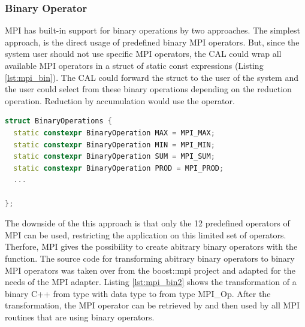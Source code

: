 
\subsubsection{Binary Operator}
\label{sec:bin_operator}

MPI has built-in support for binary operations by two approaches. The
simplest approach, is the direct usage of predefined binary MPI
operators\cite{ref:mpi_bin_op}. But, since the system user should not
use specific MPI operators, the CAL could wrap all available MPI
operators in a struct of static const expressions (Listing
\ref{lst:mpi_bin}).  The CAL could forward the struct to the user of
the system and the user could select from these binary operations
depending on the reduction operation. Reduction by accumulation would
use the  operator.


\begin{lstlisting}[language=C++, caption={A small collection of binary operators by transformed MPI operations to static constexpression }, label=lst:mpi_bin]
struct BinaryOperations { 
  static constexpr BinaryOperation MAX = MPI_MAX; 
  static constexpr BinaryOperation MIN = MPI_MIN; 
  static constexpr BinaryOperation SUM = MPI_SUM; 
  static constexpr BinaryOperation PROD = MPI_PROD; 
  ...

};
\end{lstlisting}


The downside of the this approach is that only the 12 predefined
operators of MPI can be used, restricting the application on this
limited set of operators. Therfore, MPI gives the possibility to
create abitrary binary operators with the 
function.  The source code for transforming abitrary binary operators
to binary MPI operators was taken over from the boost::mpi project
\cite{ref:boost_mpi} and adapted for the needs of the MPI adapter.
Listing \ref{lst:mpi_bin2} shows the transformation of a binary C++
 from type  with data type
 to  from type {MPI\_Op}.  After the
transformation, the MPI operator can be retrieved by
 and then used by all MPI routines that
are using binary operators.

